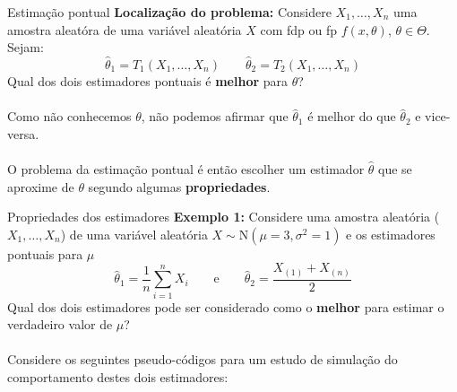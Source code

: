 \documentclass[10pt]{beamer}\usepackage[]{graphicx}\usepackage[]{color}
\providecommand{\N}{\text{N}}
\theoremstyle{definition}
\begin{document}
\begin{frame}[fragile]{Estimação pontual}
  \textbf{Localização do problema:} Considere $X_1, \ldots, X_n$ uma
  amostra aleatóra de uma variável aleatória $X$ com fdp ou fp
  $f(x,\theta)$, $\theta \in \Theta$. Sejam:
  \begin{equation*}
    \hat{\theta}_1 = T_1(X_1, \ldots, X_n) \quad \quad \hat{\theta}_2 = T_2(X_1, \ldots, X_n)
  \end{equation*}
  Qual dos dois estimadores pontuais é \textbf{melhor} para $\theta$?
  \\~\\
  Como não conhecemos $\theta$, não podemos afirmar que $\hat{\theta}_1$
  é melhor do que $\hat{\theta}_2$ e vice-versa. \\~\\
  O problema da estimação pontual é então escolher um estimador
  $\hat{\theta}$ que se aproxime de $\theta$ segundo algumas
  \textbf{propriedades}.
\end{frame}

\begin{frame}[fragile]{Propriedades dos estimadores}
  \textbf{Exemplo 1:} Considere uma amostra aleatória ($X_1, \ldots,
  X_n$) de uma variável aleatória $X \sim \N(\mu = 3, \sigma^2 = 1)$ e os
  estimadores pontuais para $\mu$
  \begin{equation*}
    \hat{\theta}_1 = \frac{1}{n} \sum_{i=1}^n X_i \qquad \text{e} \qquad
    \hat{\theta}_2 = \frac{X_{(1)}+X_{(n)}}{2}
  \end{equation*}
  Qual dos dois estimadores pode ser considerado como o \textbf{melhor}
  para estimar o verdadeiro valor de $\mu$? \\~\\
  Considere os seguintes pseudo-códigos para um estudo de simulação do
  comportamento destes dois estimadores:
\end{frame}
\end{document}
